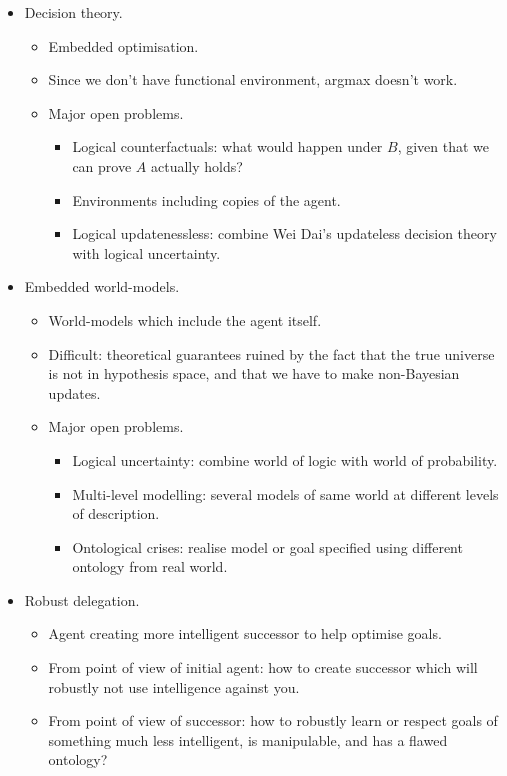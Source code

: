 \begin{itemize}
    \item Decision theory.
    \begin{itemize}
        \item Embedded optimisation.
        \item Since we don't have functional environment, argmax doesn't work.
        \item Major open problems.
        \begin{itemize}
            \item Logical counterfactuals: what would happen under $B$, given that we can prove $A$ actually holds?
            \item Environments including copies of the agent.
            \item Logical updatenessless: combine Wei Dai's updateless decision theory with logical uncertainty.
        \end{itemize}
    \end{itemize}
    \item Embedded world-models.
    \begin{itemize}
        \item World-models which include the agent itself.
        \item Difficult: theoretical guarantees ruined by the fact that the true universe is not in hypothesis space, and that we have to make non-Bayesian updates.
        \item Major open problems.
        \begin{itemize}
            \item Logical uncertainty: combine world of logic with world of probability.
            \item Multi-level modelling: several models of same world at different levels of description.
            \item Ontological crises: realise model or goal specified using different ontology from real world.
        \end{itemize}
    \end{itemize}
    \item Robust delegation.
    \begin{itemize}
        \item Agent creating more intelligent successor to help optimise goals.
        \item From point of view of initial agent: how to create successor which will robustly not use intelligence against you.
        \item From point of view of successor: how to robustly learn or respect goals of something much less intelligent, is manipulable, and has a flawed ontology?

\end{itemize}
\end{itemize}
